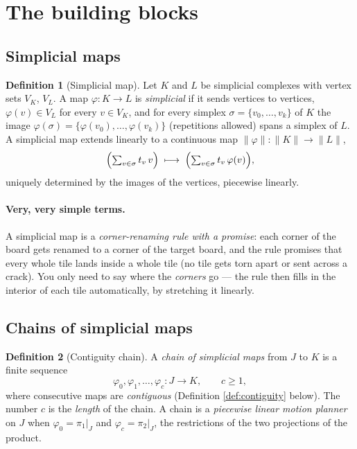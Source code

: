 \documentclass[11pt]{article}
\theoremstyle{definition}
\newtheorem{definition}{Definition}
\begin{document}
\section{The building blocks}

\subsection{Simplicial maps}

\begin{definition}[Simplicial map]
Let $K$ and $L$ be simplicial complexes with vertex sets $V_K$, $V_L$. A map
$\varphi : K \to L$ is \emph{simplicial} if it sends vertices to vertices,
$\varphi(v) \in V_L$ for every $v \in V_K$, and for every simplex
$\sigma = \{v_0, \dots, v_k\}$ of $K$ the image
$\varphi(\sigma) = \{\varphi(v_0), \dots, \varphi(v_k)\}$ (repetitions allowed)
spans a simplex of $L$. A simplicial map extends linearly to a continuous map
$\lVert\varphi\rVert : \lVert K\rVert \to \lVert L\rVert$,
\[
\Bigl(\textstyle\sum_{v\in\sigma} t_v\, v\Bigr) \;\longmapsto\;
\Bigl(\textstyle\sum_{v\in\sigma} t_v\, \varphi(v)\Bigr),
\]
uniquely determined by the images of the vertices, piecewise linearly.
\end{definition}

\paragraph{Very, very simple terms.}
A simplicial map is a \emph{corner-renaming rule with a promise}: each corner of
the board gets renamed to a corner of the target board, and the rule promises
that every whole tile lands inside a whole tile (no tile gets torn apart or sent
across a crack). You only need to say where the \emph{corners} go --- the rule
then fills in the interior of each tile automatically, by stretching it
linearly.

\subsection{Chains of simplicial maps}

\begin{definition}[Contiguity chain]
A \emph{chain of simplicial maps} from $J$ to $K$ is a finite sequence
\[
\varphi_0, \varphi_1, \dots, \varphi_c : J \longrightarrow K, \qquad c \geq 1,
\]
where consecutive maps are \emph{contiguous} (Definition
\ref{def:contiguity} below). The number $c$ is the \emph{length} of the chain.
A chain is a \emph{piecewise linear motion planner} on $J$ when
$\varphi_0 = \pi_1|_J$ and $\varphi_c = \pi_2|_J$, the restrictions of the two
projections of the product.
\end{definition}
\end{document}
